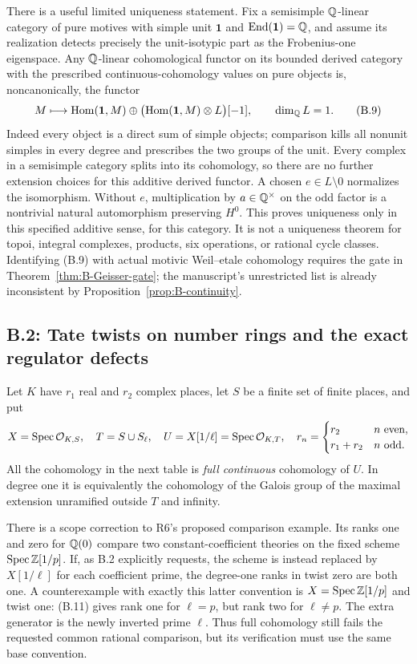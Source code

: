 There is a useful limited uniqueness statement.  Fix a semisimple
\(\mathbb Q\)-linear category of pure motives with simple unit \(\mathbf1\)
and \(\operatorname{End}(\mathbf1)=\mathbb Q\), and assume its realization detects precisely
the unit-isotypic part as the Frobenius-one eigenspace.  Any
\(\mathbb Q\)-linear cohomological functor on its bounded derived category
with the prescribed continuous-cohomology values on pure objects is,
noncanonically, the functor
\[
 M\longmapsto\operatorname{Hom}(\mathbf1,M)\oplus
 \bigl(\operatorname{Hom}(\mathbf1,M)\otimes L\bigr)[-1],\qquad \dim_\mathbb Q L=1.
 \tag{B.9}
\]
Indeed every object is a direct sum of simple objects; comparison kills
all nonunit simples in every degree and prescribes the two groups of
the unit.  Every complex in a semisimple category splits into its
cohomology, so there are no further extension choices for this additive
derived functor.  A chosen \(e\in L\setminus0\) normalizes the
isomorphism.  Without \(e\), multiplication by \(a\in\mathbb Q^\times\) on
the odd factor is a nontrivial natural automorphism preserving \(H^0\).
This proves uniqueness only in this specified additive sense, for this
category.  It is not a uniqueness theorem for topoi, integral complexes,
products, six operations, or rational cycle classes.  Identifying (B.9)
with actual motivic Weil--etale cohomology requires the gate in
Theorem~\ref{thm:B-Geisser-gate}; the manuscript's unrestricted list is
already inconsistent by Proposition~\ref{prop:B-continuity}.

\subsection{B.2: Tate twists on number rings and the exact regulator defects}
Let \(K\) have \(r_1\) real and \(r_2\) complex places, let \(S\) be
a finite set of finite places, and put
\[
 X=\operatorname{Spec}\mathcal O_{K,S},\quad T=S\cup S_\ell,\quad
 U=X[1/\ell]=\operatorname{Spec}\mathcal O_{K,T},\quad
 r_n=\begin{cases}r_2&n\text{ even},\\r_1+r_2&n\text{ odd}.
 \end{cases}
\]
All the cohomology in the next table is \emph{full continuous}
cohomology of \(U\).  In degree one it is equivalently the cohomology
of the Galois group of the maximal extension unramified outside
\(T\) and infinity.

There is a scope correction to R6's proposed comparison example.
Its ranks one and zero for \(\mathbb Q(0)\) compare two constant-coefficient
theories on the fixed scheme \(\operatorname{Spec}\mathbb Z[1/p]\).  If, as B.2
explicitly requests, the scheme is instead replaced by
\(X[1/\ell]\) for each coefficient prime, the degree-one ranks in
twist zero are both one.  A counterexample with exactly this latter
convention is \(X=\operatorname{Spec}\mathbb Z[1/p]\) and twist one: (B.11) gives
rank one for \(\ell=p\), but rank two for \(\ell\ne p\).
The extra generator is the newly inverted prime \(\ell\).
Thus full cohomology still fails the requested common rational
comparison, but its verification must use the same base convention.

